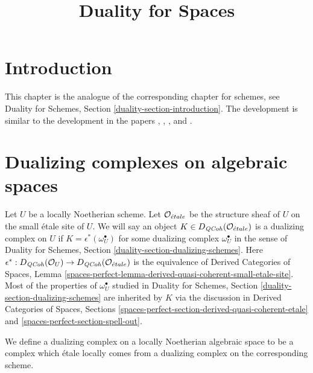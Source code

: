 

%


\title{Duality for Spaces}


\maketitle

\label{section-phantom}

\tableofcontents

\section{Introduction}
\label{section-introduction}

\noindent
This chapter is the analogue of the corresponding chapter for
schemes, see Duality for Schemes, Section \ref{duality-section-introduction}.
The development is similar to the development in the papers
\cite{Neeman-Grothendieck}, \cite{LN},
\cite{Lipman-notes}, and \cite{Neeman-improvement}.




\section{Dualizing complexes on algebraic spaces}
\label{section-dualizing-spaces}

\noindent
Let $U$ be a locally Noetherian scheme. Let $\mathcal{O}_{\acute{e}tale}$
be the structure sheaf of $U$ on the small \'etale site of $U$.
We will say an object $K \in D_{\mathit{QCoh}}(\mathcal{O}_{\acute{e}tale})$ is
a dualizing complex on $U$ if $K = \epsilon^*(\omega_U^\bullet)$
for some dualizing complex $\omega_U^\bullet$ in the sense of
Duality for Schemes, Section \ref{duality-section-dualizing-schemes}.
Here $\epsilon^* : D_{\mathit{QCoh}}(\mathcal{O}_U) \to D_{\mathit{QCoh}}(\mathcal{O}_{\acute{e}tale})$
is the equivalence of Derived Categories of Spaces, Lemma
\ref{spaces-perfect-lemma-derived-quasi-coherent-small-etale-site}.
Most of the properties of $\omega_U^\bullet$ studied in
Duality for Schemes, Section \ref{duality-section-dualizing-schemes}
are inherited by $K$ via the discussion in
Derived Categories of Spaces, Sections
\ref{spaces-perfect-section-derived-quasi-coherent-etale} and
\ref{spaces-perfect-section-spell-out}.

\medskip\noindent
We define a dualizing complex on a locally Noetherian algebraic space
to be a complex which \'etale locally comes from a dualizing
complex on the corresponding scheme.

